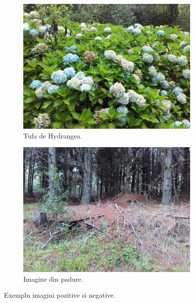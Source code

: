 \documentclass{article}
\begin{document}
\begin{figure}[h!]
  \centering
  \begin{subfigure}[b]{0.4\linewidth}
    \includegraphics[width=\linewidth]{pos.jpg}
    \caption{Tufa de Hydrangea.}
  \end{subfigure}
  \begin{subfigure}[b]{0.4\linewidth}
    \includegraphics[width=\linewidth]{neg.jpg}
    \caption{Imagine din padure.}
  \end{subfigure}
  \caption{Exemplu imagini pozitive si negative.}
  \label{fig:posneg}
\end{figure}

 

\end{document}

